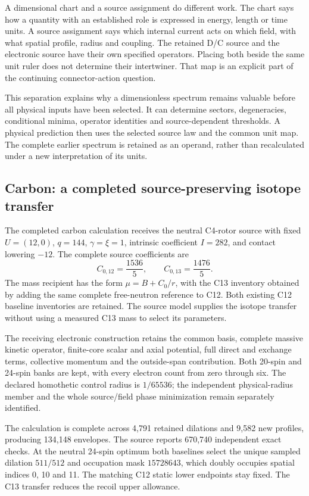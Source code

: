 A dimensional chart and a source assignment do different work. The chart says how a quantity with an established role is expressed in energy, length or time units. A source assignment says which internal current acts on which field, with what spatial profile, radius and coupling. The retained D/C source and the electronic source have their own specified operators. Placing both beside the same unit ruler does not determine their intertwiner. That map is an explicit part of the continuing connector-action question.

This separation explains why a dimensionless spectrum remains valuable before all physical inputs have been selected. It can determine sectors, degeneracies, conditional minima, operator identities and source-dependent thresholds. A physical prediction then uses the selected source law and the common unit map. The complete earlier spectrum is retained as an operand, rather than recalculated under a new interpretation of its units.

\subsection{Carbon: a completed source-preserving isotope transfer}

The completed carbon calculation receives the neutral C4-rotor source with fixed $U=(12,0)$, $q=144$, $\gamma=\xi=1$, intrinsic coefficient $I=282$, and contact lowering $-12$. The complete source coefficients are
\begin{equation}
C_{0,12}=\frac{1536}{5},\qquad C_{0,13}=\frac{1476}{5}.
\end{equation}
The mass recipient has the form $\mu=B+C_0/r$, with the C13 inventory obtained by adding the same complete free-neutron reference to C12. Both existing C12 baseline inventories are retained. The source model supplies the isotope transfer without using a measured C13 mass to select its parameters.

The receiving electronic construction retains the common basis, complete massive kinetic operator, finite-core scalar and axial potential, full direct and exchange terms, collective momentum and the outside-span contribution. Both 20-spin and 24-spin banks are kept, with every electron count from zero through six. The declared homothetic control radius is $1/65536$; the independent physical-radius member and the whole source/field phase minimization remain separately identified.

The calculation is complete across 4,791 retained dilations and 9,582 new profiles, producing 134,148 envelopes. The source reports 670,740 independent exact checks. At the neutral 24-spin optimum both baselines select the unique sampled dilation $511/512$ and occupation mask $15728643$, which doubly occupies spatial indices 0, 10 and 11. The matching C12 static lower endpoints stay fixed. The C13 transfer reduces the recoil upper allowance.

